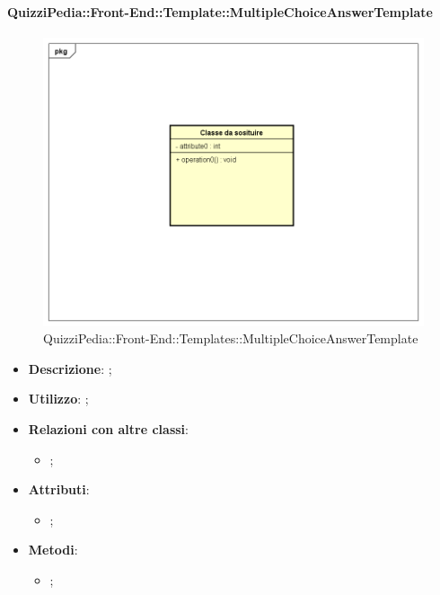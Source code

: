 		\paragraph{QuizziPedia::Front-End::Template::MultipleChoiceAnswerTemplate}
		
				\label{QuizziPedia::Front-End::Templates::MultipleChoiceAnswerTemplate}

				\begin{figure}[h]
					\centering
					\includegraphics[scale=0.5,keepaspectratio]{UML/Classi/Front-End/Temporanea.png}
					\caption{QuizziPedia::Front-End::Templates::MultipleChoiceAnswerTemplate}
				\end{figure}
						
			\begin{itemize}
				\item \textbf{Descrizione}: ;
				\item \textbf{Utilizzo}: ;
				\item \textbf{Relazioni con altre classi}: 
				\begin{itemize}
					\item ;
				\end{itemize}
				\item \textbf{Attributi}: 
				\begin{itemize}
					\item ;
				\end{itemize}
				\item \textbf{Metodi}: 
				\begin{itemize}
					\item ;
				\end{itemize}
			\end{itemize}
		
